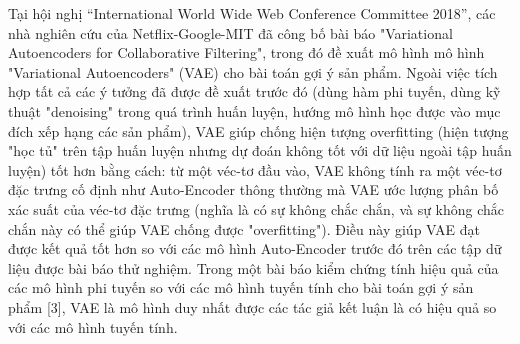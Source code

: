 Tại hội nghị “International World Wide Web Conference Committee 2018”, các nhà nghiên cứu của Netflix-Google-MIT đã công bố bài báo "Variational Autoencoders for Collaborative Filtering", trong đó đề xuất mô hình mô hình "Variational Autoencoders" (VAE) cho bài toán gợi ý sản phẩm.
Ngoài việc tích hợp tất cả các ý tưởng đã được đề xuất trước đó (dùng hàm phi tuyến, dùng kỹ thuật "denoising" trong quá trình huấn luyện, hướng mô hình học được vào mục đích xếp hạng các sản phẩm), VAE giúp chống hiện tượng overfitting (hiện tượng "học tủ" trên tập huấn luyện nhưng dự đoán không tốt với dữ liệu ngoài tập huấn luyện) tốt hơn bằng cách: từ một véc-tơ đầu vào, VAE không tính ra một véc-tơ đặc trưng cố định như Auto-Encoder thông thường mà VAE ước lượng phân bố xác suất của véc-tơ đặc trưng (nghĩa là có sự không chắc chắn, và sự không chắc chắn này có thể giúp VAE chống được "overfitting"). 
Điều này giúp VAE đạt được kết quả tốt hơn so với các mô hình Auto-Encoder trước đó trên các tập dữ liệu được bài báo thử nghiệm. 
Trong một bài báo kiểm chứng tính hiệu quả của các mô hình phi tuyến so với các mô hình tuyến tính cho bài toán gợi ý sản phẩm [3], VAE là mô hình duy nhất được các tác giả kết luận là có hiệu quả so với các mô hình tuyến tính.



